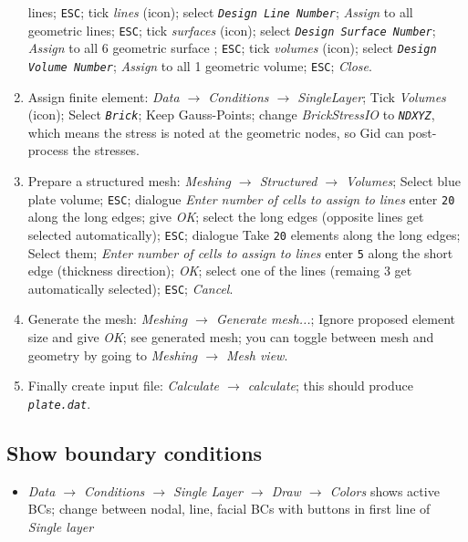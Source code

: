 \begin{enumerate}
lines; \texttt{ESC}; tick \emph{lines} (icon); select \texttt{\emph{Design
Line Number}}; \emph{Assign} to all geometric lines; \texttt{ESC};
tick \emph{surfaces} (icon); select \texttt{\emph{Design Surface Number}};
\emph{Assign} to all 6 geometric surface ; \texttt{ESC}; tick \emph{volumes}
(icon); select \texttt{\emph{Design Volume Number}}; \emph{Assign}
to all 1 geometric volume; \texttt{ESC}; \emph{Close}. 
\item Assign finite element: \emph{Data $\rightarrow$ Conditions $\rightarrow$
SingleLayer}; Tick \emph{Volumes} (icon); Select \texttt{\emph{Brick}};
Keep Gauss-Points; change \emph{BrickStressIO} to \texttt{\emph{NDXYZ}},
which means the stress is noted at the geometric nodes, so Gid can
post-process the stresses. 
\item Prepare a structured mesh: \emph{Meshing $\rightarrow$ Structured
$\rightarrow$ Volumes}; Select blue plate volume; \texttt{ESC}; dialogue
\emph{Enter number of cells to assign to lines} enter \texttt{20}
along the long edges; give \emph{OK}; select the long edges (opposite
lines get selected automatically); \texttt{ESC}; dialogue Take \texttt{20}
elements along the long edges; Select them; \emph{Enter number of
cells to assign to lines} enter \texttt{5} along the short edge (thickness
direction); \emph{OK}; select one of the lines (remaing 3 get automatically
selected); \texttt{ESC}; \emph{Cancel}. 
\item Generate the mesh: \emph{Meshing $\rightarrow$ Generate mesh...};
Ignore proposed element size and give \emph{OK}; see generated mesh;
you can toggle between mesh and geometry by going to \emph{Meshing
$\rightarrow$ Mesh view}. 
\item Finally create \baci{} input file: \emph{Calculate $\rightarrow$ calculate};
this should produce \texttt{\emph{plate.dat}}. 
\end{enumerate}

\subsection{Show boundary conditions}\label{tut_struct:sec:show-bound-cond}

\begin{itemize}
\item \emph{Data $\rightarrow$ Conditions $\rightarrow$ Single Layer $\rightarrow$
Draw $\rightarrow$ Colors} shows active BCs; change between nodal,
line, facial BCs with buttons in first line of \emph{Single layer}
\end{itemize}

